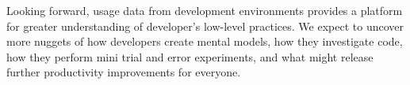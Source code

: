 \documentclass{book}
\begin{document}
Looking forward, usage data from development environments provides a platform for greater understanding of developer's low-level practices.  We expect to uncover more nuggets of how developers create mental models, how they investigate code, how they perform mini trial and error experiments, and what might release further productivity improvements for everyone.







%


\end{document}
